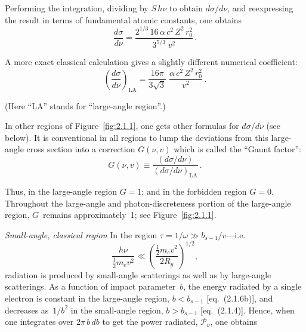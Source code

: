 Performing the integration, dividing by $S\,h\nu$ to obtain
$d\sigma/d\nu$, and reexpressing the result in terms of fundamental
atomic constants, one obtains
\begin{equation}
  \frac{d\sigma}{d\nu}
  = \frac{2^{1/3}\,16\,\alpha\,c^{2}\,Z^{2}\,r_0^{2}}
         {3^{5/3}\;v^{2}}\,.
\end{equation}

A more exact classical calculation gives a slightly different numerical
coefficient:
\begin{equation}
  \left(\frac{d\sigma}{d\nu}\right)_{\!\text{LA}}
  = \frac{16\pi}{3\sqrt{3}}\;
    \frac{\alpha\,c^{2}\,Z^{2}\,r_0^{2}}{v^{2}}\,.
  \tag{2.1.12}
\end{equation}

\noindent(Here ``LA'' stands for ``large-angle region''.)

In other regions of Figure~\ref{fig:2.1.1}, one gets other formulas for
$d\sigma/d\nu$ (see below).  It is conventional in all regions to lump
the deviations from this large-angle cross section into a correction
$G(\nu,v)$ which is called the ``Gaunt factor'':
\begin{equation}
  G(\nu,v)
  \equiv \frac{(d\sigma/d\nu)}{(d\sigma/d\nu)_{\text{LA}}}\,.
  \tag{2.1.13}
\end{equation}

Thus, in the large-angle region $G = 1$; and in the forbidden region
$G = 0$.  Throughout the large-angle and photon-discreteness portion of
the large-angle region, $G$~remains approximately~1; see
Figure~\ref{fig:2.1.1}.


\bigskip
\noindent\textit{Small-angle, classical region}\quad
In the region $\tau = 1/\omega \gg b_{s-1}/v$---i.e.
\begin{equation}
  \frac{h\nu}{\tfrac{1}{2}m_e v^{2}}
  \ll \left(\frac{\tfrac{1}{2}m_e v^{2}}{2R_y}\right)^{\!1/2},
  \tag{2.1.14}
\end{equation}
radiation is produced by small-angle scatterings as well as by
large-angle scatterings.  As a function of impact parameter~$b$, the
energy radiated by a single electron is constant in the large-angle
region, $b < b_{s-1}$ [eq.~(2.1.6b)], and decreases as~$1/b^{2}$ in
the small-angle region, $b > b_{s-1}$ [eq.~(2.1.4)].  Hence, when one
integrates over $2\pi\,b\,db$ to get the power radiated,
$\mathscr{P}_\nu$, one obtains

